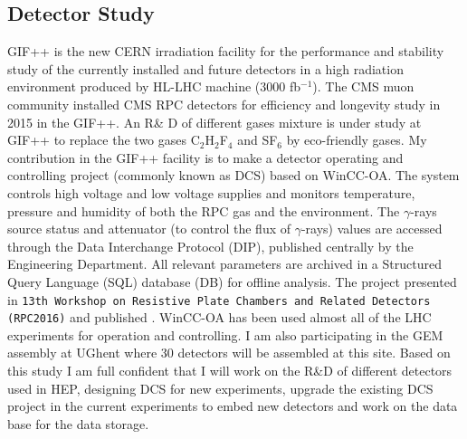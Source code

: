 \documentclass[12pt]{article}
\begin{document}
\subsection*{Detector Study}  
GIF++ is the new CERN irradiation facility for the performance and stability study of the currently installed and future detectors in a high radiation environment produced by HL-LHC machine (3000 fb$^{-1}$). The CMS muon community installed CMS RPC detectors for efficiency and longevity study in 2015 in the GIF++. An R\& D of different gases mixture is under study at GIF++ to replace the two gases C$_{2}$H$_{2}$F$_{4}$ and SF$_{6}$ by eco-friendly gases. My contribution in the GIF++ facility is to make a detector operating and controlling project (commonly known as DCS) based on WinCC-OA. The system controls high voltage and low voltage supplies and monitors temperature, pressure and humidity of both the RPC gas and the environment. The $\gamma$-rays source status and attenuator (to control the flux of $\gamma$-rays) values are accessed through the Data Interchange Protocol (DIP), published centrally by the Engineering Department. All relevant parameters are archived in a Structured Query Language (SQL) database (DB) for offline analysis. The project presented in \texttt{13th Workshop on Resistive Plate Chambers and Related Detectors (RPC2016)} and published \cite{fourth4}. WinCC-OA has been used almost all of the LHC experiments for operation and controlling. I am also participating in the GEM assembly at UGhent where 30 detectors will be assembled at this site. Based on this study I am full confident that I will work on the R\&D of different detectors used in HEP, designing DCS for new experiments, upgrade the existing DCS project in the current experiments to embed new detectors and work on the data base for the data storage.  
\end{document}

